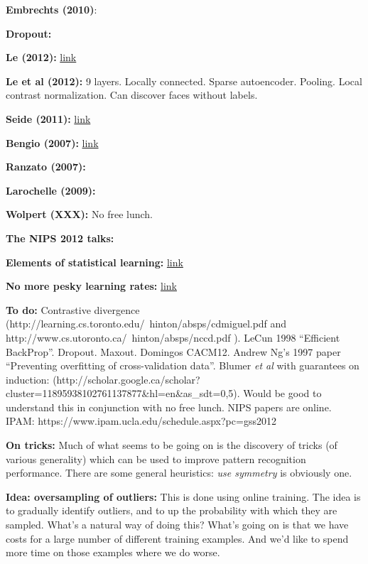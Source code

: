 \documentclass[12pt]{article}
\newcommand{\link}[2]{\href{#1}{#2}}
\begin{document}
\textbf{Embrechts (2010)}:

\textbf{Dropout:}

\textbf{Le (2012):} \link{https://plus.google.com/u/0/+ResearchatGoogle/posts/EMyhnBetd2F}{link}

\textbf{Le et al (2012):} 9 layers.  Locally connected.  Sparse
autoencoder.  Pooling.  Local contrast normalization.  Can discover
faces without labels.

\textbf{Seide (2011):}
\link{http://research.microsoft.com/apps/pubs/default.aspx?id=153169}{link}

\textbf{Bengio (2007):} \link{http://arxiv.org/pdf/1206.5533v2.pdf}{link}

\textbf{Ranzato (2007):}

\textbf{Larochelle (2009):}

\textbf{Wolpert (XXX):} No free lunch.

\textbf{The NIPS 2012 talks:}

\textbf{Elements of statistical learning:} \link{http://www.stanford.edu/\~hastie/local.ftp/Springer/OLD//ESLII\_print4.pdf}{link}

\textbf{No more pesky learning rates:} \link{http://arxiv.org/pdf/1206.1106.pdf}{link}

\textbf{To do:} Contrastive divergence
(http://learning.cs.toronto.edu/~hinton/absps/cdmiguel.pdf and
http://www.cs.utoronto.ca/~hinton/absps/nccd.pdf ). LeCun 1998
``Efficient BackProp''.  Dropout.  Maxout. Domingos CACM12.  Andrew
Ng's 1997 paper ``Preventing overfitting of cross-validation data''.
Blumer \emph{et al} with guarantees on induction:
(http://scholar.google.ca/scholar?cluster=11895938102761137877\&hl=en\&as\_sdt=0,5).
Would be good to understand this in conjunction with no free lunch.
NIPS papers are online.  IPAM: https://www.ipam.ucla.edu/schedule.aspx?pc=gss2012

\textbf{On tricks:} Much of what seems to be going on is the discovery
of tricks (of various generality) which can be used to improve pattern
recognition performance.  There are some general heuristics: \emph{use
  symmetry} is obviously one.

\textbf{Idea: oversampling of outliers:} This is done using online
training.  The idea is to gradually identify outliers, and to up the
probability with which they are sampled.  What's a natural way of
doing this?  What's going on is that we have costs for a large number
of different training examples.  And we'd like to spend more time on
those examples where we do worse.  
\end{document}

